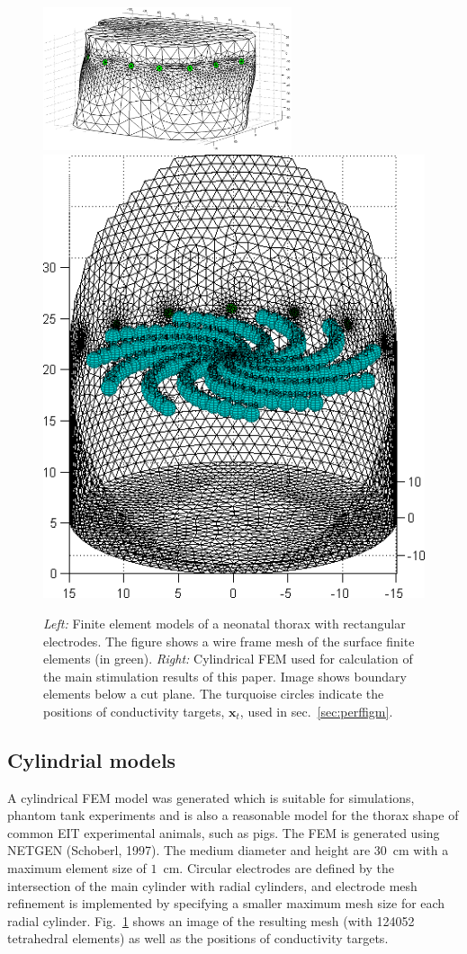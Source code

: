 \documentclass[12pt]{iopart}
\newcommand{\xB}{\mbox{$\mathbf{x}$}}
\begin{document}
\begin{figure}[bhtp]
\begin{center}
   \includegraphics[width= 0.65\textwidth]
         {figures/neonate_t_mdl.png}
  \includegraphics[width= 0.3 \textwidth]
         {../../tutorial/GREIT-evaluation/simulation_3d_test02a.png}
\caption{ \label{fig:NeonateCyl}
{\em Left:}
Finite element models of a neonatal thorax with
rectangular electrodes. The figure shows a wire frame mesh
of the surface finite elements (in green).
{\em Right:}
Cylindrical FEM used for calculation of the main stimulation
results of this paper. Image shows boundary elements below a cut plane.
The turquoise circles indicate the
positions of conductivity targets, $\xB_t$, used in
sec.\ \ref{sec:perffigm}.
}
\end{center}
\end{figure}


\subsection{Cylindrial models}


A cylindrical FEM model was generated which is suitable for
simulations, phantom tank experiments and is also a reasonable
model for the thorax shape of common EIT experimental animals,
such as pigs.  The FEM is generated using NETGEN (Schoberl, 1997).
The medium diameter
and height are $30$~cm with a maximum element size of $1$~cm.
Circular electrodes are defined by the intersection of the 
main cylinder with radial cylinders, and
electrode mesh refinement is implemented by specifying a
smaller maximum mesh size for each radial cylinder.
Fig.\ \ref{fig:NeonateCyl} shows an image of the resulting
mesh (with 124052 tetrahedral elements) as well as the positions
of conductivity targets.
\end{document}
